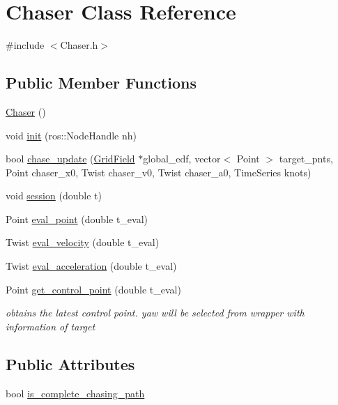 \hypertarget{class_chaser}{}\section{Chaser Class Reference}
\label{class_chaser}


{\ttfamily \#include $<$Chaser.\+h$>$}

\subsection*{Public Member Functions}
\begin{DoxyCompactItemize}
\item 
\hyperlink{class_chaser_ae1179fa7b77db9c80468f88222e32f09}{Chaser} ()
\item 
void \hyperlink{class_chaser_a3538485980643e885755608e4297d1f6}{init} (ros\+::\+Node\+Handle nh)
\item 
bool \hyperlink{class_chaser_a8feeca68466b9b4576ee9c99b624dfc5}{chase\+\_\+update} (\hyperlink{struct_grid_field}{Grid\+Field} $\ast$global\+\_\+edf, vector$<$ Point $>$ target\+\_\+pnts, Point chaser\+\_\+x0, Twist chaser\+\_\+v0, Twist chaser\+\_\+a0, Time\+Series knots)
\item 
void \hyperlink{class_chaser_a7d736728bb5327acf0d334d7d4b1b844}{session} (double t)
\item 
Point \hyperlink{class_chaser_a6dca60b8af1c63eff3235515255cf355}{eval\+\_\+point} (double t\+\_\+eval)
\item 
Twist \hyperlink{class_chaser_a208374e7b85f9a35c1c00ec4f1ec65c3}{eval\+\_\+velocity} (double t\+\_\+eval)
\item 
Twist \hyperlink{class_chaser_a2fe36102d5a9befcb4c6ada3375260ed}{eval\+\_\+acceleration} (double t\+\_\+eval)
\item 
Point \hyperlink{class_chaser_a7a42e3dd3ca45e343652318e591f87d1}{get\+\_\+control\+\_\+point} (double t\+\_\+eval)
\begin{DoxyCompactList}\small\item\em obtains the latest control point. yaw will be selected from wrapper with information of target \end{DoxyCompactList}\end{DoxyCompactItemize}
\subsection*{Public Attributes}
\begin{DoxyCompactItemize}
\item 
bool \hyperlink{class_chaser_a53af032471ad6bdc828c4eae78085813}{is\+\_\+complete\+\_\+chasing\+\_\+path}
\end{DoxyCompactItemize}


